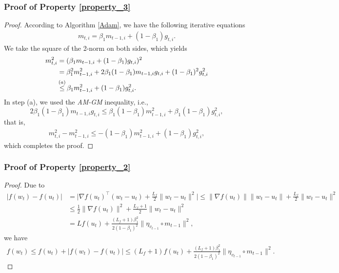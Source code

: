 \documentclass{article} %
\begin{document}
\subsubsection{Proof of Property \ref{property_3}}
\begin{proof}
According to Algorithm \ref{Adam}, we have the following iterative equations
\begin{align*}
m_{t,i}=\beta_{1}m_{t-1,i}+(1-\beta_{1})g_{t,i}.
\end{align*}
We take the square of the 2-norm on both sides, which yields
\begin{align*}
m_{t,i}^{2}&=(\beta_{1}m_{t-1,i}+(1-\beta_{1})g_{t,i})^{2}\notag\\&=\beta_{1}^{2}m_{t-1,i}^{2}+2\beta_{1}(1-\beta_{1})m_{t-1,i}g_{t,i}+(1-\beta_{1})^{2}g_{t,i}^{2}\notag\\&\mathop{\le}^{(a)}\beta_{1}m_{t-1,i}^{2}+(1-\beta_{1})g_{t,i}^{2}.%
\end{align*}
In step (a), we used the \emph{AM-GM} inequality, i.e.,
\[2\beta_{1}(1-\beta_{1})m_{t-1,i}g_{t,i}\le \beta_{1}(1-\beta_{1})m_{t-1,i}^{2}+\beta_{1}(1-\beta_{1})g_{t,i}^{2},\] that is,
\begin{align*}
m_{t,i}^{2}-m_{t-1,i}^{2}\le -(1-\beta_{1})m_{t-1,i}^{2}+(1-\beta_{1})g_{t,i}^{2},
\end{align*}
which completes the proof.
\end{proof}

\subsubsection{Proof of Property \ref{property_2}}
\begin{proof}
Due to
\begin{align*}
|f(w_t)-f(u_t)|&=\bigg|\nabla f(u_{t})^{\top}(w_t-u_t)+\frac{L_{f}}{2}\|w_t-u_t\|^{2}\bigg|\le \|\nabla f(u_{t})\|\|w_t-u_t\|+\frac{L_{f}}{2}\|w_t-u_t\|^{2}\\&\le \frac{1}{2}\|\nabla f(u_{t})\|^{2}+\frac{L_{f}+1}{2}\|w_{t}-u_{t}\|^{2}\\&={L} f(u_{t})+\frac{(L_{f}+1)\beta_{1}^{2}}{2(1-\beta_1)^{2}}\|\eta_{v_{t-1}}\circ m_{t-1}\|^{2},
\end{align*}
we have
\begin{align*}
    f(w_{t})\le f(u_{t})+|f(w_t)-f(u_t)|\le (L_{f}+1)f(u_{t})+\frac{(L_{f}+1)\beta_{1}^{2}}{2(1-\beta_1)^{2}}\|\eta_{v_{t-1}}\circ m_{t-1}\|^{2}. \tag*{\qedhere}
\end{align*}
\end{proof}
\end{document}
